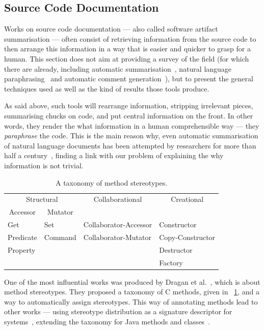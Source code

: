 \documentclass[a4paper,11pt]{sdm_internship}
\newcommand\CC{C\nolinebreak[4]\hspace{-.05em}\raisebox{.4ex}{\relsize{-3}{\textbf{++}}}}
\theoremstyle{definition}
\begin{document}
\subsection{Source Code Documentation}%
\label{ssec:doc_generation}
Works on source code documentation --- also called software artifact summarisation --- often consist of retrieving information from the source code to then arrange this information in a way that is easier and quicker to grasp for a human.
This section does not aim at providing a survey of the field (for which there are already, including automatic summarisation~\cite{jones2007automatic,nazar2016summarizing}, natural language paraphrasing~\cite{neubig2016survey} and automatic comment generation~\cite{wang2018comment}), but to present the general techniques used as well as the kind of results those tools produce.

As said above, such tools will rearrange information, stripping irrelevant pieces, summarising chucks on code, and put central information on the front.
In other words, they render the what information in a human comprehensible way --- they \emph{paraphrase} the code.
This is the main reason why, even automatic summarisation of natural language documents has been attempted by researchers for more than half a century~\cite{jones2007automatic}, finding a link with our problem of explaining the why information is not trivial.

\begin{table}
  \centering
  \begin{tabular}{llll}
    \toprule
    \multicolumn{2}{c}{Structural} & \multicolumn{1}{c}{Collaborational} & \multicolumn{1}{c}{Creational} \\
    \multicolumn{1}{c}{Accessor} & \multicolumn{1}{c}{Mutator} & & \\
    \midrule
    Get & Set & Collaborator-Accessor & Constructor \\
    Predicate & Command & Collaborator-Mutator & Copy-Constructor \\
    Property & & & Destructor \\
     & & & Factory \\
    \bottomrule
  \end{tabular}
  \caption{A taxonomy of method stereotypes.}%
  \label{tab:dragan_taxonomy}
\end{table}

One of the most influential works was produced by Dragan et al.~\cite{dragan2006reverse,dragan2011emergent}, which is about method stereotypes.
They proposed a taxonomy of \CC{} methods, given in \tablename~\ref{tab:dragan_taxonomy}, and a way to automatically assign stereotypes.
This way of annotating methods lead to other works --- using stereotype distribution as a signature descriptor for systems~\cite{dragan2009using}, extending the taxonomy for Java methods and classes~\cite{moreno2012jstereocode}.
\end{document}
